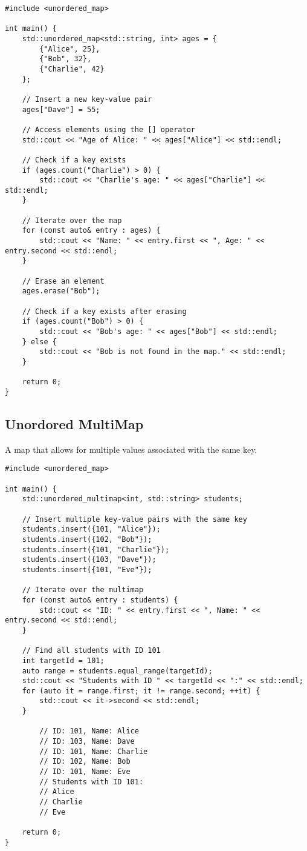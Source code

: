 \begin{verbatim}
#include <unordered_map>

int main() {
    std::unordered_map<std::string, int> ages = {
        {"Alice", 25},
        {"Bob", 32},
        {"Charlie", 42}
    };

    // Insert a new key-value pair
    ages["Dave"] = 55;

    // Access elements using the [] operator
    std::cout << "Age of Alice: " << ages["Alice"] << std::endl;

    // Check if a key exists
    if (ages.count("Charlie") > 0) {
        std::cout << "Charlie's age: " << ages["Charlie"] << std::endl;
    }

    // Iterate over the map
    for (const auto& entry : ages) {
        std::cout << "Name: " << entry.first << ", Age: " << entry.second << std::endl;
    }

    // Erase an element
    ages.erase("Bob");

    // Check if a key exists after erasing
    if (ages.count("Bob") > 0) {
        std::cout << "Bob's age: " << ages["Bob"] << std::endl;
    } else {
        std::cout << "Bob is not found in the map." << std::endl;
    }

    return 0;
}
\end{verbatim}

\subsection{Unordored MultiMap}

A map that allows for multiple values associated with the same key. 

\begin{verbatim}
#include <unordered_map>

int main() {
    std::unordered_multimap<int, std::string> students;

    // Insert multiple key-value pairs with the same key
    students.insert({101, "Alice"});
    students.insert({102, "Bob"});
    students.insert({101, "Charlie"});
    students.insert({103, "Dave"});
    students.insert({101, "Eve"});

    // Iterate over the multimap
    for (const auto& entry : students) {
        std::cout << "ID: " << entry.first << ", Name: " << entry.second << std::endl;
    }

    // Find all students with ID 101
    int targetId = 101;
    auto range = students.equal_range(targetId);
    std::cout << "Students with ID " << targetId << ":" << std::endl;
    for (auto it = range.first; it != range.second; ++it) {
        std::cout << it->second << std::endl;
    }

        // ID: 101, Name: Alice
        // ID: 103, Name: Dave
        // ID: 101, Name: Charlie
        // ID: 102, Name: Bob
        // ID: 101, Name: Eve
        // Students with ID 101:
        // Alice
        // Charlie
        // Eve

    return 0;
}
\end{verbatim}

